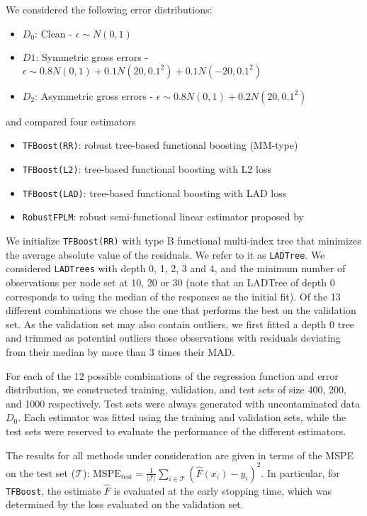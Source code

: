 We considered the following error distributions: 

\begin{itemize}
 \setlength\itemsep{0em}
\item $D_0$: Clean - $\epsilon \sim N(0,1)$
\item $D1$: Symmetric gross errors - $\epsilon \sim 0.8 N(0,1) + 0.1 N(20,0.1^2) + 0.1 N(-20, 0.1^2)$ 
\item $D_2$: Asymmetric gross errors - $\epsilon \sim 0.8 N(0,1) + 0.2 N(20,0.1^2)$ 
\end{itemize}
and compared four estimators 
\begin{itemize}
\itemsep0em 
\item \texttt{TFBoost(RR)}: robust tree-based functional boosting (MM-type)
\item \texttt{TFBoost(L2)}: tree-based functional boosting with L2 loss
\item \texttt{TFBoost(LAD)}: tree-based functional boosting with LAD loss
\item \texttt{RobustFPLM}: robust semi-functional linear estimator proposed by \cite{boente2020robust}
\end{itemize}
We initialize \texttt{TFBoost(RR)} with type B functional multi-index tree that minimizes the average absolute value of the residuals. We refer to it as \texttt{LADTree}.  We considered \texttt{LADTrees} with depth 0, 1, 2, 3 and 4, and the minimum number of observations per node set at 10, 20 or 30 (note that an LADTree of depth 0 corresponds to using the median of the responses as the initial fit). Of the 13 different combinations we chose the one that performs the best on the validation set. As the validation set may also contain outliers, we first fitted a depth 0 tree and trimmed as potential outliers those observations with residuals deviating from their median by more than 3 times their MAD.


For each of the 12 possible combinations of the regression function and error distribution, we constructed training, validation, and test sets of size 400, 200, and 1000 respectively.   Test sets were always generated with uncontaminated data $D_0$. Each estimator was fitted using the training and validation sets, while the test sets were reserved to evaluate the performance of the different estimators.   

The results for all methods under consideration are given in terms of the MSPE on the test set ($\mathcal{T}$): $\text{MSPE}_{\text{test}} = \frac{1}{|\mathcal{T}|} \sum_{i \in \mathcal{T}} (\hat{F}(x_i) - y_i)^2$.  In particular, for \texttt{TFBoost}, the estimate $\hat{F}$ is evaluated at the early stopping time, which was determined by the loss evaluated on the validation set.   






 